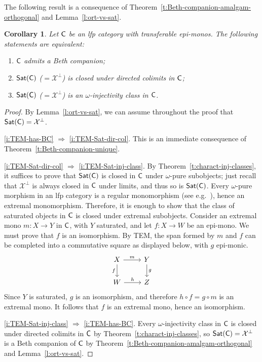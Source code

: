\documentclass[a4paper,10pt,reqno]{amsart}
\newtheorem{corollary}[theorem]{Corollary}
\theoremstyle{definition}
\theoremstyle{remark}
\newcommand{\cat}{{\sf C}}								%
\newcommand{\Sat}{{\sf Sat}}								%
\newcommand{\ar}[1]{\mathcal{#1}}							%
\newcommand{\X}{\ar{X}}									%
\newcommand{\ort}[1]{{#1}^{\perp}}						%
\newcommand{\IMP}{\Rightarrow}						%
\newcommand{\TEM}{\textnormal{TEM}}
\begin{document}
The following result is a consequence of Theorem~\ref{t:Beth-companion-amalgam-orthogonal} and Lemma~\ref{l:ort-vs-sat}.

\begin{corollary}\label{cor:Beth-TEM-omega-ort}
Let $\cat$ be an lfp category with transferable epi-monos. The following statements are equivalent:
\begin{enumerate}[label=(\arabic*)]
\item\label{i:TEM-has-BC} $\cat$ admits a Beth companion;
\item\label{i:TEM-Sat-dir-col} $\Sat(\cat)$ ($=\ort{\X}$) is closed under directed colimits in $\cat$;
\item\label{i:TEM-Sat-inj-class} $\Sat(\cat)$ ($=\ort{\X}$) is an $\omega$-injectivity class in $\cat$. 
\end{enumerate}
\end{corollary}

\begin{proof}
By Lemma~\ref{l:ort-vs-sat}, we can assume throughout the proof that $\Sat(\cat)=\ort{\X}$.

\ref{i:TEM-has-BC} $\IMP$ \ref{i:TEM-Sat-dir-col}. This is an immediate consequence of Theorem~\ref{t:Beth-companion-unique}. 

\ref{i:TEM-Sat-dir-col} $\IMP$ \ref{i:TEM-Sat-inj-class}. By Theorem~\ref{t:charact-inj-classes}, it suffices to prove that $\Sat(\cat)$ is closed in $\cat$ under $\omega$-pure subobjects; just recall that $\ort{\X}$ is always closed in $\cat$ under limits, and thus so is $\Sat(\cat)$. Every $\omega$-pure morphism in an lfp category is a regular monomorphism (see e.g.\ \cite[Proposition~2.31]{ar94book}), hence an extremal monomorphism. Therefore, it is enough to show that the class of saturated objects in $\cat$ is closed under extremal subobjects. Consider an extremal mono $m\colon X \to Y$ in $\cat$, with $Y$ saturated, and let $f\colon X\to W$ be an epi-mono. We must prove that $f$ is an isomorphism. By \TEM, the span formed by $m$ and $f$ can be completed into a commutative square as displayed below, with $g$ epi-monic.
\[\begin{tikzcd}
X \arrow{r}{m} \arrow{d}[swap]{f} & Y \arrow{d}{g} \\
W \arrow{r}{h} & Z
\end{tikzcd}\]
%
Since $Y$ is saturated, $g$ is an isomorphism, and therefore $h\circ f = g\circ m$ is an extremal mono. It follows that $f$ is an extremal mono, hence an isomorphism.


\ref{i:TEM-Sat-inj-class} $\IMP$ \ref{i:TEM-has-BC}. Every $\omega$-injectivity class in $\cat$ is closed under directed colimits in $\cat$ by Theorem~\ref{t:charact-inj-classes}, so $\Sat(\cat)=\ort{\X}$ is a Beth companion of $\cat$ by Theorem~\ref{t:Beth-companion-amalgam-orthogonal} and Lemma~\ref{l:ort-vs-sat}.
\end{proof}
\end{document}
